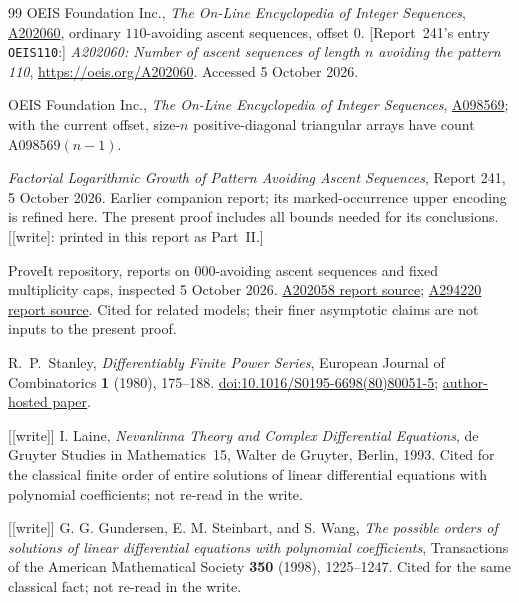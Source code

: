 \documentclass[11pt,letterpaper]{article}
\theoremstyle{remark}\newtheorem{remark}[theorem]{Remark}
\newcommand{\wtag}{\textup{[write]}}
\theoremstyle{remark}\newtheorem{wremark}{Remark}\renewcommand{\thewremark}{W\arabic{wremark}}
\theoremstyle{plain}\newtheorem{wcorollary}[wremark]{Corollary}
\begin{document}
\begin{thebibliography}{99}
OEIS Foundation Inc., \emph{The On-Line Encyclopedia of Integer Sequences},
\href{https://oeis.org/A202060}{A202060}, ordinary $110$-avoiding ascent sequences, offset $0$.
[Report~241's entry \texttt{OEIS110}:] \emph{A202060: Number of ascent sequences of length $n$ avoiding the pattern 110},
\url{https://oeis.org/A202060}. Accessed 5 October 2026.

OEIS Foundation Inc., \emph{The On-Line Encyclopedia of Integer Sequences},
\href{https://oeis.org/A098569}{A098569}; with the current offset,
size-$n$ positive-diagonal triangular arrays have count A098569$(n-1)$.

\emph{Factorial Logarithmic Growth of Pattern Avoiding Ascent Sequences},
Report 241, 5 October 2026. Earlier companion report; its marked-occurrence upper encoding is refined here. The present proof includes all bounds needed for its conclusions.
[\wtag: printed in this report as Part~II.]

ProveIt repository, reports on $000$-avoiding ascent sequences and fixed
multiplicity caps, inspected 5 October 2026.
\href{https://github.com/VladimirReshetnikov/ProveIt/blob/main/SetTheory/Cardinals/docs/reports/generating-functions-and-asymptotics/oeis-sequence-asymptotics/a202058-ascent-000-growth/article.tex}{A202058 report source};
\href{https://github.com/VladimirReshetnikov/ProveIt/blob/main/SetTheory/Cardinals/docs/reports/generating-functions-and-asymptotics/oeis-sequence-asymptotics/a294220-ascent-multiplicity-caps/article.tex}{A294220 report source}.
Cited for related models; their finer asymptotic
claims are not inputs to the present proof.

R.~P.~Stanley, \emph{Differentiably Finite Power Series},
European Journal of Combinatorics \textbf{1} (1980), 175--188.
\href{https://doi.org/10.1016/S0195-6698(80)80051-5}{doi:10.1016/S0195-6698(80)80051-5};
\href{https://math.mit.edu/~rstan/pubs/pubfiles/45.pdf}{author-hosted paper}.

[\wtag] I. Laine, \emph{Nevanlinna Theory and Complex Differential
Equations}, de Gruyter Studies in Mathematics~15, Walter de Gruyter, Berlin,
1993. Cited for the classical finite order of entire solutions of linear
differential equations with polynomial coefficients; not re-read in the
write.

[\wtag] G. G. Gundersen, E. M. Steinbart, and S. Wang, \emph{The possible
orders of solutions of linear differential equations with polynomial
coefficients}, Transactions of the American Mathematical Society
\textbf{350} (1998), 1225--1247. Cited for the same classical fact; not
re-read in the write.
\end{thebibliography}
\end{document}
